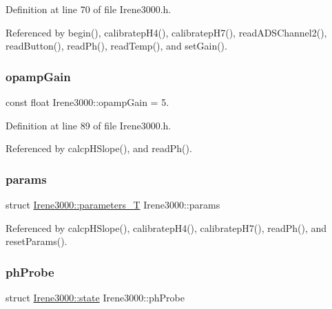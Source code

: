 Definition at line 70 of file Irene3000.\+h.



Referenced by begin(), calibratep\+H4(), calibratep\+H7(), read\+A\+D\+S\+Channel2(), read\+Button(), read\+Ph(), read\+Temp(), and set\+Gain().

\mbox{\label{classIrene3000_a4e588985ca74e5076029d5dee81034f2}} 
\subsubsection{\texorpdfstring{opamp\+Gain}{opampGain}}
{\footnotesize\ttfamily const float Irene3000\+::opamp\+Gain = 5.\hspace{0.3cm}{\ttfamily [private]}}



Definition at line 89 of file Irene3000.\+h.



Referenced by calcp\+H\+Slope(), and read\+Ph().

\mbox{\label{classIrene3000_a136585a5ee7f9ac6ab52175fa153f8e3}} 
\subsubsection{\texorpdfstring{params}{params}}
{\footnotesize\ttfamily struct \hyperlink{structIrene3000_1_1parameters__T}{Irene3000\+::parameters\+\_\+T} Irene3000\+::params\hspace{0.3cm}{\ttfamily [private]}}



Referenced by calcp\+H\+Slope(), calibratep\+H4(), calibratep\+H7(), read\+Ph(), and reset\+Params().

\mbox{\label{classIrene3000_a997a4ee466fa1d5416e07e444965dc9e}} 
\subsubsection{\texorpdfstring{ph\+Probe}{phProbe}}
{\footnotesize\ttfamily struct \hyperlink{structIrene3000_1_1state}{Irene3000\+::state}  Irene3000\+::ph\+Probe\hspace{0.3cm}{\ttfamily [private]}}



